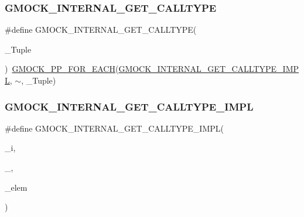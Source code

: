 \subsubsection{\texorpdfstring{GMOCK\_INTERNAL\_GET\_CALLTYPE}{GMOCK\_INTERNAL\_GET\_CALLTYPE}}
{\footnotesize\ttfamily \#define G\+M\+O\+C\+K\+\_\+\+I\+N\+T\+E\+R\+N\+A\+L\+\_\+\+G\+E\+T\+\_\+\+C\+A\+L\+L\+T\+Y\+PE(\begin{DoxyParamCaption}\item[{}]{\+\_\+\+Tuple }\end{DoxyParamCaption})~\mbox{\hyperlink{_obj__test_2lib_2googletest-master_2googlemock_2include_2gmock_2internal_2gmock-pp_8h_abc9368d9b0960531e3cfb9e5d6a41816}{G\+M\+O\+C\+K\+\_\+\+P\+P\+\_\+\+F\+O\+R\+\_\+\+E\+A\+CH}}(\mbox{\hyperlink{_obj__test_2lib_2googletest-master_2googlemock_2include_2gmock_2gmock-function-mocker_8h_a917552654709591f0b38c20f16018b1e}{G\+M\+O\+C\+K\+\_\+\+I\+N\+T\+E\+R\+N\+A\+L\+\_\+\+G\+E\+T\+\_\+\+C\+A\+L\+L\+T\+Y\+P\+E\+\_\+\+I\+M\+PL}}, $\sim$, \+\_\+\+Tuple)}

\mbox{\label{googletest-master_2googlemock_2include_2gmock_2gmock-function-mocker_8h_a917552654709591f0b38c20f16018b1e}} 
\subsubsection{\texorpdfstring{GMOCK\_INTERNAL\_GET\_CALLTYPE\_IMPL}{GMOCK\_INTERNAL\_GET\_CALLTYPE\_IMPL}}
{\footnotesize\ttfamily \#define G\+M\+O\+C\+K\+\_\+\+I\+N\+T\+E\+R\+N\+A\+L\+\_\+\+G\+E\+T\+\_\+\+C\+A\+L\+L\+T\+Y\+P\+E\+\_\+\+I\+M\+PL(\begin{DoxyParamCaption}\item[{}]{\+\_\+i,  }\item[{}]{\+\_\+,  }\item[{}]{\+\_\+elem }\end{DoxyParamCaption})}

